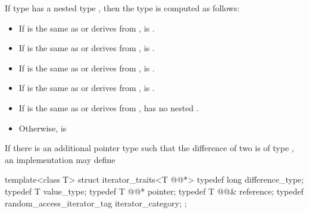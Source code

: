 {\color{newclr}
\pnum
If type  has a nested type , then the
type  is computed as follows:
\begin{itemize}
\item If  is the same as or derives from ,
       is .
\item If  is the same as or derives from ,
       is .
\item If  is the same as or derives from ,
       is .
\item If  is the same as or derives from ,
       is .
\item If  is the same as or derives from ,
       has no nested .
\item Otherwise,  is 
\end{itemize}
}

\begin{removedblock}
\pnum
\enternote
If there is an additional pointer type
such that the difference of two
is of type
,
an implementation may define

\begin{codeblock}
  template<class T> struct iterator_traits<T @@*> {
    typedef long difference_type;
    typedef T value_type;
    typedef T @@* pointer;
    typedef T @@& reference;
    typedef random_access_iterator_tag iterator_category;
  };
\end{codeblock}
\exitnote
\end{removedblock}

